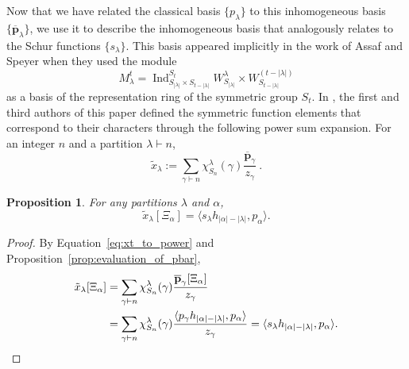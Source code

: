 \documentclass{amsart}
\DeclareMathOperator{\Ind}{Ind}
\newtheorem{prop}[lemma]{Proposition}
\theoremstyle{definition}
\newcommand{\xt}{\tilde x}
\newcommand{\mike}[1]{\todo[size=\tiny,color=magenta!30]{#1 \\ \hfill --- Mike}}
\newcommand{\rosa}[1]{\todo[size=\tiny,color=cyan]{#1 \\ \hfill --- Rosa}}
\begin{document}
Now that we have related the classical basis $\{p_\lambda\}$ to this inhomogeneous
basis $\{\overline{\mathbf p}_\lambda\}$, we use it
to describe the inhomogeneous basis that analogously relates to the Schur functions $\{s_\lambda\}$.
This basis appeared implicitly in the work of Assaf and Speyer \cite{AS_specht} when they used the module
\[M_\lambda^t=\Ind_{S_{|\lambda|}\times S_{t-|\lambda|}}^{S_t} W^\lambda_{S_{|\lambda|}} \times W^{(t-|\lambda|)}_{S_{t-|\lambda|}}\]
as a basis of the representation ring of the symmetric group $S_t$.
In \cite{OZ_hopf}, the first and third authors of this paper defined the symmetric function elements that correspond to their characters through the following power sum expansion.
For an integer $n$ and a partition $\lambda \vdash n$,
\begin{equation}\label{eq:xt_to_power}
\xt_\lambda := \sum_{\gamma \vdash n} \chi^\lambda_{S_n}(\gamma) \frac{{\overline{\mathbf p}}_\gamma}{z_\gamma}~.
\end{equation}

\begin{prop}\label{prop:evaluation_of_xt}
	For any partitions $\lambda$ and $\alpha$,
	\[\xt_\lambda[\Xi_\alpha]=\langle s_\lambda h_{|\alpha|-|\lambda|},p_\alpha\rangle.\]
\end{prop}

\begin{proof}
	By Equation~\eqref{eq:xt_to_power} and  Proposition~\ref{prop:evaluation_of_pbar},
	\begin{align*}
		\xt_\lambda[\Xi_\alpha]&=\sum_{\gamma \vdash n} \chi^\lambda_{S_n}(\gamma) \frac{{\overline{\mathbf p}}_\gamma[\Xi_\alpha]}{z_\gamma}\\
		&=\sum_{\gamma \vdash n} \chi^\lambda_{S_n}(\gamma) \frac{\langle p_\gamma h_{|\alpha|-|\lambda|},p_\alpha\rangle}{z_\gamma}
		=\langle s_\lambda h_{|\alpha|-|\lambda|},p_\alpha\rangle. \qedhere
	\end{align*}
\end{proof}
\end{document}
